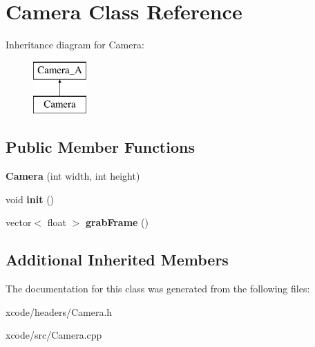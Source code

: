 \hypertarget{class_camera}{\section{Camera Class Reference}
\label{class_camera}
}
Inheritance diagram for Camera\-:\begin{figure}[H]
\begin{center}
\leavevmode
\includegraphics[height=2.000000cm]{class_camera}
\end{center}
\end{figure}
\subsection*{Public Member Functions}
\begin{DoxyCompactItemize}
\item 
\hypertarget{class_camera_ab8bd59938caefc7935fda5f5cfcb7a75}{{\bfseries Camera} (int width, int height)}\label{class_camera_ab8bd59938caefc7935fda5f5cfcb7a75}

\item 
\hypertarget{class_camera_af930ce1f46c9f5af3bd5e5bbff6b5022}{void {\bfseries init} ()}\label{class_camera_af930ce1f46c9f5af3bd5e5bbff6b5022}

\item 
\hypertarget{class_camera_a3374922c6e19f1174c469fbb7d0c7a03}{vector$<$ float $>$ {\bfseries grab\-Frame} ()}\label{class_camera_a3374922c6e19f1174c469fbb7d0c7a03}

\end{DoxyCompactItemize}
\subsection*{Additional Inherited Members}


The documentation for this class was generated from the following files\-:\begin{DoxyCompactItemize}
\item 
xcode/headers/Camera.\-h\item 
xcode/src/Camera.\-cpp\end{DoxyCompactItemize}
